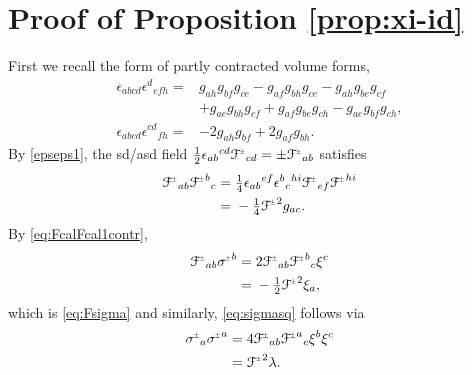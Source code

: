 \documentclass[a4paper,10pt,reqno]{amsart}
\theoremstyle{plain}
\newcommand{\PM}[1]{{{#1}^{\hspace{-.5pt}\scaleto{\pm}{3.5pt}}}}
\def\Fcal{\mathcal{F}}
\numberwithin{equation}{section}
\begin{document}
%
\appendix 
%
\section{Proof of Proposition \ref{prop:xi-id}} \label{sec:xi-id-proof} 


%
First we recall the form of partly contracted volume forms,
\begin{align}
\epsilon_{abcd}\epsilon^{d}{}_{efh}
={}&g_{ah} g_{bf} g_{ce}
 -  g_{af} g_{bh} g_{ce}  -  g_{ah} g_{be} g_{cf}\nonumber \\
 & + g_{ae} g_{bh} g_{cf}
 + g_{af} g_{be} g_{ch}
 -  g_{ae} g_{bf} g_{ch}, \label{epseps1}\\
\epsilon_{abcd}\epsilon^{cd}{}_{fh}={}&-2 g_{ah} g_{bf}
 + 2 g_{af} g_{bh}.\label{epseps2}
\end{align}
By \eqref{epseps1}, the sd/asd field $\tfrac{1}{2} \epsilon_{ab}{}^{cd}  \PM{\Fcal}_{cd} = \pm \PM{\Fcal}_{ab} $ satisfies
\begin{align} \label{eq:FcalFcal1contr}
\PM{\Fcal}_{ab} \PM{\Fcal}^{b}{}_{c} 
={}& \tfrac{1}{4} \epsilon_{ab}{}^{ef}\epsilon^{b}{}_{c}{}^{hi} \PM{\Fcal}_{ef} \PM{\Fcal}^{hi} \nonumber \\
={}& -\tfrac{1}{4}  \PM{\Fcal}^2 g_{ac}.
\end{align}
By \eqref{eq:FcalFcal1contr},
\begin{align*}
\PM{\Fcal}_{ab} \PM{\sigma}^{b}
={}& 2 \PM{\Fcal}_{ab} \PM{\Fcal}^{b}{}_{c} \xi^{c} \\
={}& - \tfrac{1}{2} \PM{\Fcal}^2\xi_{a}, 
\end{align*}
which is \eqref{eq:Fsigma} and similarly, \eqref{eq:sigmasq} follows via
\begin{align*}
\PM{\sigma}_{a} \PM{\sigma}^{a}
={}& 4 \PM{\Fcal}_{ab} \PM{\Fcal}^{a}{}_{c} \xi^{b} \xi^{c}\\
={}& \PM{\Fcal}^2 \lambda.
\end{align*}
\end{document}
